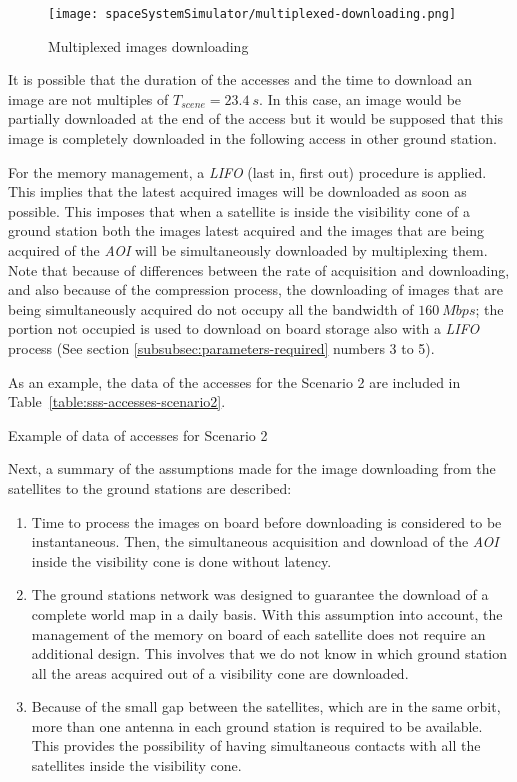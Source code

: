 \begin{figure}[!h]
\begin{center}
\texttt{[image: spaceSystemSimulator/multiplexed-downloading.png]}
\caption{Multiplexed images downloading}
\label{fig:sss-multiplexed-downloading}
\end{center}
\end{figure}



It is possible that the duration of the accesses and the time to download an image are not multiples of $T_{scene}=23.4~s$. In this case, an image would be partially downloaded at the end of the access but it would be supposed that this image is completely downloaded in the following access in other ground station.

For the memory management, a \emph{LIFO} (last in, first out) procedure is
applied. This implies that the latest acquired images will be downloaded as soon
as possible. This imposes that when a satellite is inside the visibility cone of
a ground station both the images latest acquired and the images that are being
acquired of the \emph{AOI} will be simultaneously downloaded by multiplexing
them. Note that because of differences between the rate of acquisition and
downloading, and also because of the compression process, the downloading of
images that are being simultaneously acquired do not occupy all the bandwidth of
$160~Mbps$; the portion not occupied is used to download on board storage also
with a \emph{LIFO} process (See section \ref{subsubsec:parameters-required} numbers 3 to 5).


As an example, the data of the accesses for the Scenario 2 are included in Table~\ref{table:sss-accesses-scenario2}.


\begin{table}[h]
  \centering
  {\small
  
  }
  \caption{Example of data of accesses for Scenario 2}
  \label{table:sss-accesses-scenario2}
\end{table}


Next, a summary of the assumptions made for the image downloading from the
satellites to the ground stations are described:
\begin{enumerate}
\item Time to process the images on board before downloading is considered to be instantaneous. Then, the simultaneous acquisition and download of the \emph{AOI} inside the visibility cone is done without latency.
\item The ground stations network was designed to guarantee the download of a complete world map in a daily basis. With this assumption into account, the management of the memory on board of each satellite does not require an additional design. This involves that we do not know in which ground station all the areas acquired out of a visibility cone are downloaded.
\item Because of the small gap between the satellites, which are in the same orbit, more than one antenna in each ground station is required to be available. This provides the possibility of having simultaneous contacts with all the satellites inside the visibility cone.
\end{enumerate}

